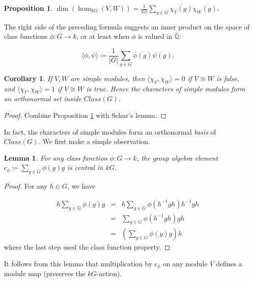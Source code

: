 \documentclass[12pt,titlepage]{article}
\newcommand{\itexarray}[1]{\begin{matrix}#1\end{matrix}}
\newcommand{\widebar}{\overline}
\theoremstyle{plain}
\newtheorem{lemma}{Lemma}
\newtheorem{prop}{Proposition}
\newtheorem{cor}{Corollary}
\theoremstyle{definition}
\theoremstyle{remark}
\begin{document}
\begin{prop}
\label{inner}\hypertarget{inner}{}
$\dim (\hom_{k G}(V, W)) = \frac1{{|G|}} \sum_{g \in G} \widebar{\chi_V(g)} \chi_W(g)$.

\end{prop}
The right side of the preceding formula suggests an inner product on the space of class functions $\phi: G \to k$, or at least when $\phi$ is valued in $\widebar{\mathbb{Q}}$:

\begin{displaymath}
\langle \phi, \psi \rangle \coloneqq \frac1{{|G|}} \sum_{g \in G} \widebar{\phi(g)} \psi(g).
\end{displaymath}
\begin{cor}
\label{}\hypertarget{}{}
If $V, W$ are simple modules, then $\langle \chi_V, \chi_W \rangle = 0$ if $V \cong W$ is false, and $\langle \chi_V, \chi_W \rangle = 1$ if $V \cong W$ is true. Hence the characters of simple modules form an orthonormal set inside $Class(G)$.

\end{cor}
\begin{proof}
Combine Proposition \ref{inner} with Schur's lemma.

\end{proof}
In fact, the characters of simple modules form an orthonormal \emph{basis} of $Class(G)$. We first make a simple observation.

\begin{lemma}
\label{central}\hypertarget{central}{}
For any class function $\phi: G \to k$, the group algebra element $c_\phi \coloneqq \sum_{g \in G} \phi(g) g$ is central in $k G$.

\end{lemma}
\begin{proof}
For any $h \in G$, we have

\begin{displaymath}
\itexarray{
h \sum_{g \in G} \phi(g) g & = & h \sum_{g \in G} \phi(h^{-1}g h) h^{-1}g h \\ 
 & = & \sum_{g \in G} \phi(h^{-1}g h) g h \\ 
 & = & \left(\sum_{g \in G} \phi(g) g\right)h
}
\end{displaymath}
where the last step used the class function property.

\end{proof}
It follows from this lemma that multiplication by $c_\phi$ on any module $V$ defines a module map (preserves the $k G$-action).
\end{document}
